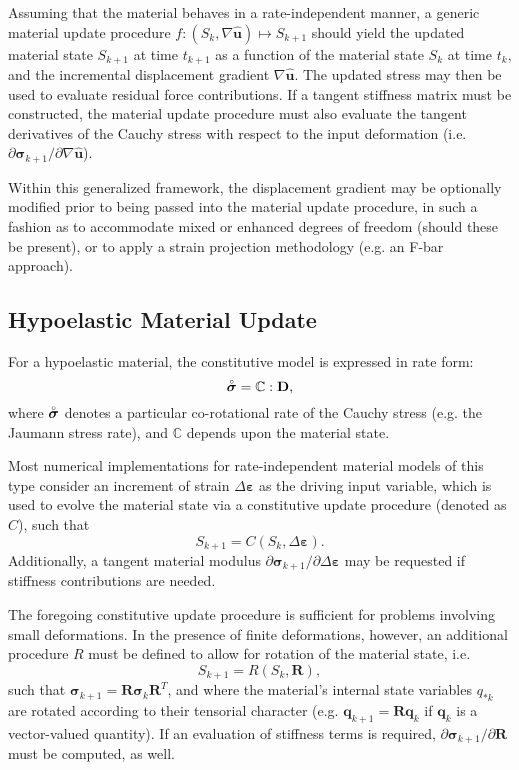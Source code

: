 Assuming that the material behaves in a rate-independent manner, a generic material update procedure $f \colon (S_k, \nabla \hat{\mathbf{u}}) \mapsto S_{k+1}$ should yield the updated material state $S_{k+1}$ at time $t_{k+1}$ as a function of the material state $S_k$ at time $t_k$, and the incremental displacement gradient $\nabla \hat{\mathbf{u}}$. The updated stress may then be used to evaluate residual force contributions. If a tangent stiffness matrix must be constructed, the material update procedure must also evaluate the tangent derivatives of the Cauchy stress with respect to the input deformation (i.e. $\partial \boldsymbol{\sigma}_{k+1} / \partial \nabla \hat{\mathbf{u}}$).

Within this generalized framework, the displacement gradient may be optionally modified prior to being passed into the material update procedure, in such a fashion as to accommodate mixed or enhanced degrees of freedom (should these be present), or to apply a strain projection methodology (e.g. an F-bar approach).

\subsection{Hypoelastic Material Update}

For a hypoelastic material, the constitutive model is expressed in rate form:
\begin{equation}
        \accentset{\circ}{\boldsymbol{\sigma}} = \mathbb{C} : \mathbf{D},
\end{equation}
where $\accentset{\circ}{\boldsymbol{\sigma}}$ denotes a particular co-rotational rate of the Cauchy stress (e.g. the Jaumann stress rate), and $\mathbb{C}$ depends upon the material state.

Most numerical implementations for rate-independent material models of this type consider an increment of strain $\Delta \boldsymbol{\varepsilon}$ as the driving input variable, which is used to evolve the material state via a constitutive update procedure (denoted as $C$), such that
\begin{equation}
    S_{k+1} = C (S_{k}, \Delta \boldsymbol{\varepsilon}).
\end{equation}
Additionally, a tangent material modulus $\partial \boldsymbol{\sigma}_{k+1} / \partial \Delta \boldsymbol{\varepsilon}$ may be requested if stiffness contributions are needed.

The foregoing constitutive update procedure is sufficient for problems involving small deformations. In the presence of finite deformations, however, an additional procedure $R$ must be defined to allow for rotation of the material state, i.e.
\begin{equation}
    S_{k+1} = R (S_k, \mathbf{R}),
\end{equation}
such that $\boldsymbol{\sigma}_{k+1} = \mathbf{R} \boldsymbol{\sigma}_{k} \mathbf{R}^T$, and where the material's internal state variables $q_{*k}$ are rotated according to their tensorial character (e.g. $\mathbf{q}_{k+1} = \mathbf{R} \mathbf{q}_k$ if $\mathbf{q}_k$ is a vector-valued quantity). If an evaluation of stiffness terms is required, $\partial \boldsymbol{\sigma}_{k+1} / \partial \mathbf{R}$ must be computed, as well.

